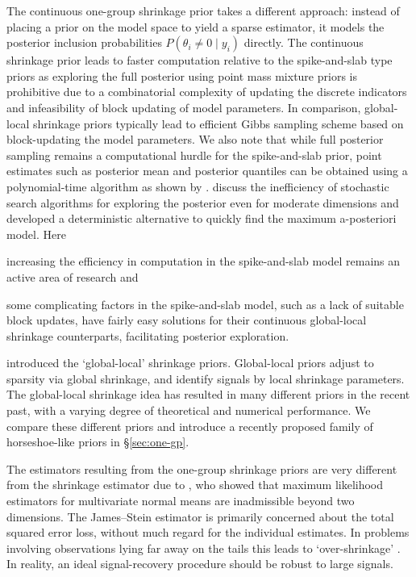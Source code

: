 \documentclass[sts,preprint]{imsart}
\begin{document}
The continuous one-group shrinkage prior takes a different approach: instead of  placing a prior on the model space to yield a sparse estimator, it models the posterior inclusion probabilities $P(\theta_i \ne 0 \mid y_i)$ directly. The continuous shrinkage prior leads to faster computation relative to the spike-and-slab type priors as exploring the full posterior using point mass mixture priors is prohibitive due to a combinatorial complexity of updating the discrete indicators and infeasibility of block updating of model parameters. In comparison, global-local shrinkage priors typically lead to efficient Gibbs sampling scheme based on block-updating the model parameters. We also note that while full posterior sampling remains a computational hurdle for the spike-and-slab prior, point estimates such as posterior mean and posterior quantiles can be obtained using a polynomial-time algorithm as shown by \citet{castillo2012needles}. \citet{rovckova2016spike} discuss the inefficiency of stochastic search algorithms for exploring the posterior even for moderate dimensions and developed a deterministic alternative to quickly find the maximum a-posteriori model. Here \begin{enumerate*}
  \item increasing the efficiency in computation in the spike-and-slab model
    remains an active area of research \citep[see, e.g., ][]{rovckova2016spike}
    and
  \item some complicating factors in the spike-and-slab model, such as a lack of suitable block updates, have fairly easy solutions for their continuous global-local shrinkage counterparts, facilitating posterior exploration. 
\end{enumerate*}

\citet{carvalho2009handling, polson2010shrink, carvalho2010horseshoe, polson2012half} introduced the `global-local' shrinkage priors. Global-local priors adjust to sparsity via global shrinkage, and identify signals by local shrinkage parameters. The global-local shrinkage idea has resulted in many different priors in the recent past, with a varying degree of theoretical and numerical performance. We compare these different priors and introduce a recently proposed family of horseshoe-like priors in \S \ref{sec:one-gp}.   

The estimators resulting from the one-group shrinkage priors are very different from the shrinkage estimator due to \citet{james_estimation_1961}, who showed that maximum likelihood estimators for multivariate normal means are inadmissible beyond two dimensions. The James--Stein estimator is primarily concerned about the total squared error loss, without much regard for the individual estimates. In problems involving observations lying far away on the tails this leads to `over-shrinkage' \citep{carvalho2010horseshoe}. In reality, an ideal signal-recovery procedure should be robust to large signals. 
\end{document}
